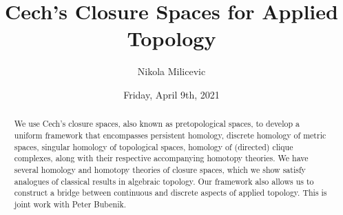 \documentclass{UAmathtalk}
\author{Nikola Milicevic}
\title{Cech's Closure Spaces for Applied Topology}
\date{Friday, April 9th, 2021}
\begin{document}
\maketitle

\begin{abstract}
We use Cech's closure spaces, also known as pretopological spaces, to develop a uniform framework that encompasses persistent homology, discrete homology of metric spaces, singular homology of topological spaces, homology of (directed) clique complexes, along with their respective accompanying homotopy theories. We have several homology and homotopy theories of closure spaces, which we show satisfy analogues of classical results in algebraic topology. Our framework also allows us to construct a bridge between continuous and discrete aspects of applied topology. This is joint work with Peter Bubenik.
\end{abstract}
\end{document}
